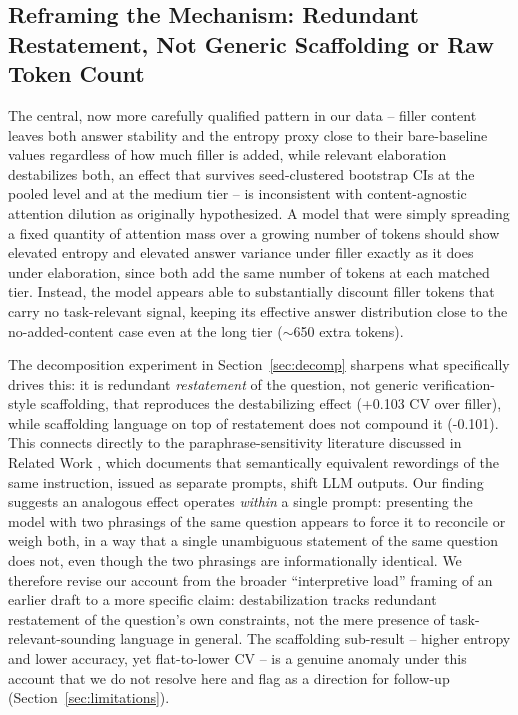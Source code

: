 \documentclass[11pt,letterpaper]{article}
\begin{document}
\subsection{Reframing the Mechanism: Redundant Restatement, Not Generic Scaffolding or Raw Token Count}
\label{sec:reframing}

The central, now more carefully qualified pattern in our data -- filler content leaves both answer stability and the entropy proxy close to their bare-baseline values regardless of how much filler is added, while relevant elaboration destabilizes both, an effect that survives seed-clustered bootstrap CIs at the pooled level and at the medium tier -- is inconsistent with content-agnostic attention dilution as originally hypothesized. A model that were simply spreading a fixed quantity of attention mass over a growing number of tokens should show elevated entropy and elevated answer variance under filler exactly as it does under elaboration, since both add the same number of tokens at each matched tier. Instead, the model appears able to substantially discount filler tokens that carry no task-relevant signal, keeping its effective answer distribution close to the no-added-content case even at the long tier ($\sim$650 extra tokens).

The decomposition experiment in Section~\ref{sec:decomp} sharpens what specifically drives this: it is redundant \emph{restatement} of the question, not generic verification-style scaffolding, that reproduces the destabilizing effect (+0.103 CV over filler), while scaffolding language on top of restatement does not compound it (-0.101). This connects directly to the paraphrase-sensitivity literature discussed in Related Work \citep{Sclar2023,Mizrahi2023}, which documents that semantically equivalent rewordings of the same instruction, issued as separate prompts, shift LLM outputs. Our finding suggests an analogous effect operates \emph{within} a single prompt: presenting the model with two phrasings of the same question appears to force it to reconcile or weigh both, in a way that a single unambiguous statement of the same question does not, even though the two phrasings are informationally identical. We therefore revise our account from the broader ``interpretive load'' framing of an earlier draft to a more specific claim: destabilization tracks redundant restatement of the question's own constraints, not the mere presence of task-relevant-sounding language in general. The scaffolding sub-result -- higher entropy and lower accuracy, yet flat-to-lower CV -- is a genuine anomaly under this account that we do not resolve here and flag as a direction for follow-up (Section~\ref{sec:limitations}).
\end{document}
